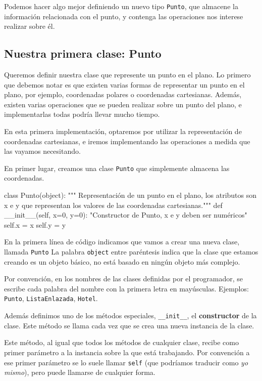 Podemos hacer algo mejor definiendo un nuevo tipo \lstinline!Punto!, que almacene
la información relacionada con el punto, y contenga las operaciones nos
interese realizar sobre él.

\subsection{Nuestra primera clase: Punto}

Queremos definir nuestra clase que represente un punto en el plano.
Lo primero que debemos notar es que existen varias formas de representar un
punto en el plano, por ejemplo, coordenadas polares o coordenadas
cartesianas.
Además, existen varias operaciones que se pueden realizar sobre un punto
del plano, e implementarlas todas podría llevar mucho tiempo.

En esta primera implementación, optaremos por utilizar la representación de
coordenadas cartesianas, e iremos implementando las operaciones a medida
que las vayamos necesitando.

En primer lugar, creamos una clase \lstinline!Punto! que simplemente
almacena las coordenadas.

\begin{codigo-python}
class Punto(object):
    """ Representación de un punto en el plano, los atributos son x e y
        que representan los valores de las coordenadas cartesianas."""
    def __init__(self, x=0, y=0):
        "Constructor de Punto, x e y deben ser numéricos"
        self.x = x
        self.y = y
\end{codigo-python}

En la primera línea de código indicamos que vamos a crear una nueva clase,
llamada \lstinline!Punto!  La palabra \lstinline!object! entre paréntesis
indica que la clase que estamos creando es un objeto básico, no está basado en
ningún objeto más complejo.

\begin{observacion}
Por convención, en los nombres de las clases definidas por el programador, se
escribe cada palabra del nombre con la primera letra en mayúsculas.  Ejemplos:
\lstinline!Punto!, \lstinline!ListaEnlazada!, \lstinline!Hotel!.
\end{observacion}

Además definimos uno de los métodos especiales, \lstinline!__init__!, el
{\bf constructor} de la clase.  Este método se llama cada vez que se crea
una nueva instancia de la clase.

Este método, al igual que todos los métodos de cualquier clase, recibe como
primer parámetro a la instancia sobre la que está trabajando.  Por
convención a ese primer parámetro se lo suele llamar \lstinline!self! (que
podríamos traducir como {\it yo mismo}), pero puede llamarse de cualquier
forma.

